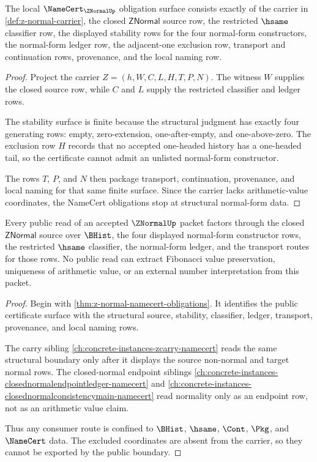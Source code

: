 \begin{theorem}
\label{thm:z-normal-namecert-obligations}
The local $\NameCert_{\ZNormalUp}$ obligation surface consists exactly of the carrier in \autoref{def:z-normal-carrier}, the closed $\mathsf{ZNormal}$ source row, the restricted $\hsame$ classifier row, the displayed stability rows for the four normal-form constructors, the normal-form ledger row, the adjacent-one exclusion row, transport and continuation rows, provenance, and the local naming row.
\end{theorem}
\begin{proof}
Project the carrier $Z=(h,W,C,L,H,T,P,N)$. The witness $W$ supplies the closed source row, while $C$ and $L$ supply the restricted classifier and ledger rows.

The stability surface is finite because the structural judgment has exactly four generating rows: empty, zero-extension, one-after-empty, and one-above-zero. The exclusion row $H$ records that no accepted one-headed history has a one-headed tail, so the certificate cannot admit an unlisted normal-form constructor.

The rows $T$, $P$, and $N$ then package transport, continuation, provenance, and local naming for that same finite surface. Since the carrier lacks arithmetic-value coordinates, the NameCert obligations stop at structural normal-form data.
\end{proof}

\begin{theorem}
\label{thm:z-normal-public-normal-form-boundary}
Every public read of an accepted $\ZNormalUp$ packet factors through the closed $\mathsf{ZNormal}$ source over $\BHist$, the four displayed normal-form constructor rows, the restricted $\hsame$ classifier, the normal-form ledger, and the transport routes for those rows. No public read can extract Fibonacci value preservation, uniqueness of arithmetic value, or an external number interpretation from this packet.
\end{theorem}
\begin{proof}
Begin with \autoref{thm:z-normal-namecert-obligations}. It identifies the public certificate surface with the structural source, stability, classifier, ledger, transport, provenance, and local naming rows.

The carry sibling \autoref{ch:concrete-instances-zcarry-namecert} reads the same structural boundary only after it displays the source non-normal and target normal rows. The closed-normal endpoint siblings \autoref{ch:concrete-instances-closednormalendpointledger-namecert} and \autoref{ch:concrete-instances-closednormalconsistencymain-namecert} read normality only as an endpoint row, not as an arithmetic value claim.

Thus any consumer route is confined to $\BHist$, $\hsame$, $\Cont$, $\Pkg$, and $\NameCert$ data. The excluded coordinates are absent from the carrier, so they cannot be exported by the public boundary.
\end{proof}

